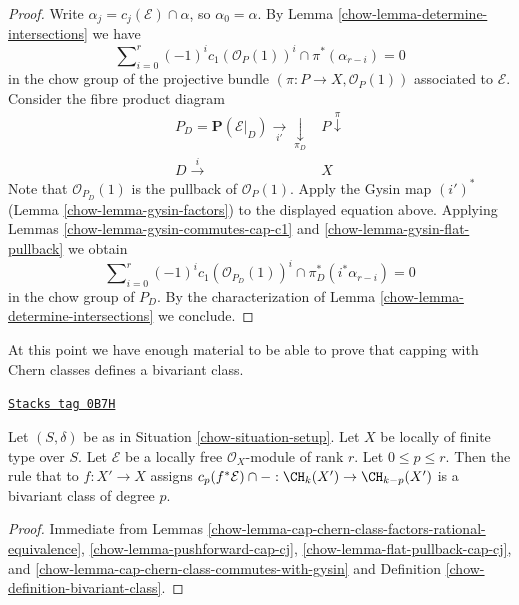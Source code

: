 \begin{proof}

Write $\alpha_j = c_j(\mathcal{E}) \cap \alpha$, so $\alpha_0 = \alpha$.
By Lemma \ref{chow-lemma-determine-intersections} we have
$$
\sum\nolimits_{i = 0}^r
(-1)^i c_1(\mathcal{O}_P(1))^i \cap
\pi^*(\alpha_{r - i}) = 0
$$
in the chow group of the projective bundle
$(\pi : P \to X, \mathcal{O}_P(1))$
associated to $\mathcal{E}$. Consider the fibre product diagram
$$
\begin{array}{cc}P_D = \mathbf{P}(\mathcal{E}|_D) \underset{i'}{\longrightarrow}\underset{\pi_D}{\downarrow} & P \overset{\pi}{\downarrow} \\ D \overset{i}{\longrightarrow} & X\end{array}
$$
Note that $\mathcal{O}_{P_D}(1)$ is the pullback of $\mathcal{O}_P(1)$.
Apply the Gysin map $(i')^*$ (Lemma \ref{chow-lemma-gysin-factors}) to the
displayed equation above.
Applying Lemmas \ref{chow-lemma-gysin-commutes-cap-c1} and
\ref{chow-lemma-gysin-flat-pullback} we obtain
$$
\sum\nolimits_{i = 0}^r
(-1)^i c_1(\mathcal{O}_{P_D}(1))^i \cap
\pi_D^*(i^*\alpha_{r - i}) = 0
$$
in the chow group of $P_D$.
By the characterization of Lemma \ref{chow-lemma-determine-intersections}
we conclude.
\end{proof}

At this point we have enough material to be able to prove that
capping with Chern classes defines a bivariant class.

\begin{lemma}
\label{chow-lemma-cap-cp-bivariant}
\href{https://stacks.math.columbia.edu/tag/0B7H}{\texttt{Stacks tag 0B7H}}

Let $(S, \delta)$ be as in Situation \ref{chow-situation-setup}.
Let $X$ be locally of finite type over $S$.
Let $\mathcal{E}$ be a locally free $\mathcal{O}_X$-module
of rank $r$. Let $0 \leq p \leq r$.
Then the rule that to $f : X' \to X$ assigns
$c_p(f^*\mathcal{E}) \cap - : \CH_k(X') \to \CH_{k - p}(X')$
is a bivariant class of degree $p$.
\end{lemma}

\begin{proof}

Immediate from Lemmas
\ref{chow-lemma-cap-chern-class-factors-rational-equivalence},
\ref{chow-lemma-pushforward-cap-cj},
\ref{chow-lemma-flat-pullback-cap-cj}, and
\ref{chow-lemma-cap-chern-class-commutes-with-gysin}
and Definition \ref{chow-definition-bivariant-class}.
\end{proof}

